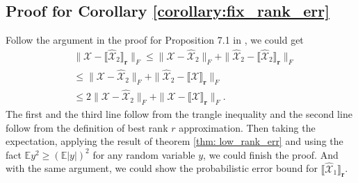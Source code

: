 \subsection{Proof for Corollary \ref{corollary:fix_rank_err}}
Follow the argument in the proof for Proposition 7.1 in \cite{tropp2017practical}, we could get 
\begin{equation}
\begin{aligned}
&\|\mathscr{X} - \llbracket \hat{\mathscr{X}}_2 \rrbracket_\mathbf{r}\|_F \le \|\mathscr{X} -  \hat{\mathscr{X}}_2\|_F+\|\hat{\mathscr{X}}_2 -  \llbracket\hat{\mathscr{X}}_2\rrbracket_\mathbf{r}\|_F\\
&\le \|\mathscr{X} -  \hat{\mathscr{X}}_2\|_F+\|\hat{\mathscr{X}}_2 -  \llbracket \mathscr{X}\rrbracket_\mathbf{r}\|_F \\
&\le 2\|\mathscr{X} - \hat{\mathscr{X}}_2 \|_F + \|\mathscr{X} -  \llbracket \mathscr{X} \rrbracket_\mathbf{r}\|_F.
\end{aligned}
\end{equation}
The first and the third line follow from the trangle inequality and the second line follow from the definition of best rank $r$ approximation. Then taking the expectation, applying the result of theorem \ref{thm: low_rank_err} and using the fact $\mathbb{E} y^2 \ge (\mathbb{E} |y|)^2$ for any random variable $y$, we could finish the proof. And with the same argument, we could show the probabilistic error bound for $\llbracket\hat{\mathscr{X}}_1\rrbracket_\mathbf{r}$.

